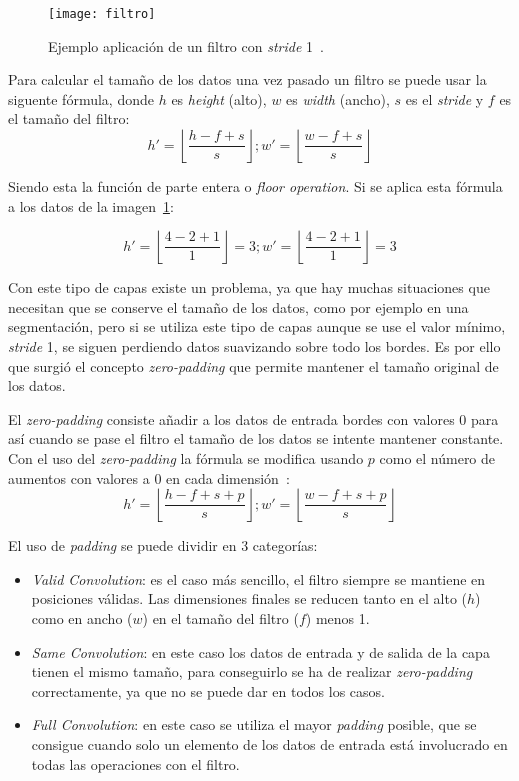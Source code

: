 \begin{figure}[h]
	\centering
	\texttt{[image: filtro]}
	\caption{Ejemplo aplicación de un filtro con \textit{stride} 1~\cite{cnn}.}
	\label{fig:filtro}
\end{figure}

Para calcular el tamaño de los datos una vez pasado un filtro se puede usar la siguente fórmula, donde $h$ es \textit{height} (alto), $w$ es \textit{width} (ancho), $s$ es el \textit{stride} y $f$ es el tamaño del filtro:
\begin{equation}
h'=\left \lfloor \frac{h-f+s}{s} \right \rfloor; w'= \left \lfloor \frac{w-f+s}{s} \right \rfloor
\end{equation}

Siendo esta la función de parte entera o \textit{floor operation}. Si se aplica esta fórmula a los datos de la imagen~\ref{fig:filtro}:

\begin{equation}
h'=\left \lfloor \frac{4-2+1}{1} \right \rfloor = 3; w'= \left \lfloor \frac{4-2+1}{1} \right \rfloor=3
\end{equation}

Con este tipo de capas existe un problema, ya que hay muchas situaciones que necesitan que se conserve el tamaño de los datos, como por ejemplo en una segmentación, pero si se utiliza este tipo de capas aunque se use el valor mínimo, \textit{stride} 1, se siguen perdiendo datos suavizando sobre todo los bordes. Es por ello que surgió el concepto \textit{zero-padding} que permite mantener el tamaño original de los datos.

El \textit{zero-padding} consiste añadir a los datos de entrada bordes con valores 0 para así cuando se pase el filtro el tamaño de los datos se intente mantener constante. Con el uso del \textit{zero-padding} la fórmula se modifica usando $p$ como el número de aumentos con valores a 0 en cada dimensión~\cite{zeropadding}:
\begin{equation}
h'=\left \lfloor \frac{h-f+s+p}{s} \right \rfloor; w'= \left \lfloor \frac{w-f+s+p}{s} \right \rfloor
\end{equation}

El uso de \textit{padding} se puede dividir en 3 categorías:
\begin{itemize}
	\item \textit{Valid Convolution}: es el caso más sencillo, el filtro siempre se mantiene en posiciones válidas. Las dimensiones finales se reducen tanto en el alto ($h$) como en ancho ($w$) en el tamaño del filtro ($f$) menos 1.
	\item \textit{Same Convolution}: en este caso los datos de entrada y de salida de la capa tienen el mismo tamaño, para conseguirlo se ha de realizar \textit{zero-padding} correctamente, ya que no se puede dar en todos los casos.
	\item \textit{Full Convolution}: en este caso se utiliza el mayor \textit{padding} posible, que se consigue cuando solo un elemento de los datos de entrada está involucrado en todas las operaciones con el filtro.
\end{itemize}

